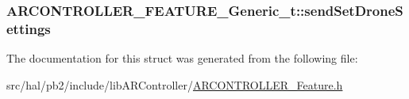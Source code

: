 \subsubsection[{\texorpdfstring{send\+Set\+Drone\+Settings}{sendSetDroneSettings}}]{ A\+R\+C\+O\+N\+T\+R\+O\+L\+L\+E\+R\+\_\+\+F\+E\+A\+T\+U\+R\+E\+\_\+\+Generic\+\_\+t\+::send\+Set\+Drone\+Settings}\hypertarget{struct_a_r_c_o_n_t_r_o_l_l_e_r___f_e_a_t_u_r_e___generic__t_abc89c7f418dc67f7c088c9f8f93571cd}{}\label{struct_a_r_c_o_n_t_r_o_l_l_e_r___f_e_a_t_u_r_e___generic__t_abc89c7f418dc67f7c088c9f8f93571cd}


The documentation for this struct was generated from the following file\+:\begin{DoxyCompactItemize}
\item 
src/hal/pb2/include/lib\+A\+R\+Controller/\hyperlink{_a_r_c_o_n_t_r_o_l_l_e_r___feature_8h}{A\+R\+C\+O\+N\+T\+R\+O\+L\+L\+E\+R\+\_\+\+Feature.\+h}\end{DoxyCompactItemize}
